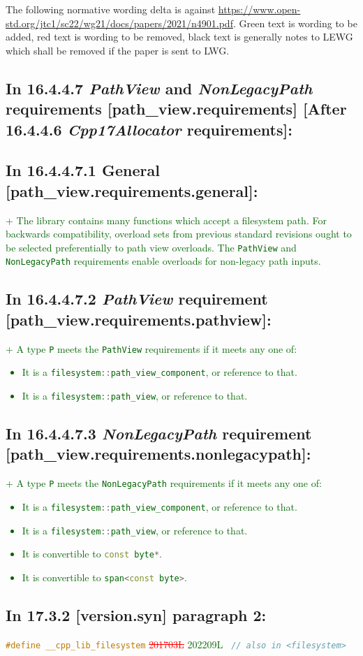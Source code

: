 \documentclass[11pt]{article}
\newcommand{\code}[2][cpp]{\lstinline[language=#1,basicstyle=\small\ttfamily]{#2}}
\newcommand{\tsrefp}[3]{\subsection*{In #2 \textbf{[#1]} paragraph #3:}}
\newcommand{\tsref}[2]{\subsection*{In #2 \textbf{[#1]}:}}
\newcommand{\tsrefz}[1]{\subsection*{In #1:}}
\newcommand{\tsreplace}[3]{\textcolor{red}{\sout{#1}}#2\textcolor{darkgreen}{#3}}
\begin{document}
The following normative wording delta is against \url{https://www.open-std.org/jtc1/sc22/wg21/docs/papers/2021/n4901.pdf}. Green text is wording to be added, red text is wording to be removed, black text is generally notes to LEWG which shall be removed if the paper is sent to LWG.

\tsref{After 16.4.4.6 \emph{Cpp17Allocator} requirements}{16.4.4.7 \emph{PathView} and \emph{NonLegacyPath} requirements [path\_view.requirements]}

\tsrefz{16.4.4.7.1 General [path\_view.requirements.general]}

\tsreplace{}{}{+ The library contains many functions which accept a filesystem path. For backwards compatibility, overload sets from previous standard revisions ought to be selected preferentially to path view overloads. The \code{PathView} and \code{NonLegacyPath} requirements enable overloads for non-legacy path inputs.}

\tsrefz{16.4.4.7.2 \emph{PathView} requirement [path\_view.requirements.pathview]}

\tsreplace{}{}{+ A type \code{P} meets the \code{PathView} requirements if it meets any one of:
\begin{itemize}
    \item It is a \code{filesystem::path_view_component}, or reference to that.
    \item It is a \code{filesystem::path_view}, or reference to that.
\end{itemize}}

\tsrefz{16.4.4.7.3 \emph{NonLegacyPath} requirement [path\_view.requirements.nonlegacypath]}

\tsreplace{}{}{+ A type \code{P} meets the \code{NonLegacyPath} requirements if it meets any one of:
\begin{itemize}
    \item It is a \code{filesystem::path_view_component}, or reference to that.
    \item It is a \code{filesystem::path_view}, or reference to that.
    \item It is convertible to \code{const byte*}.
    \item It is convertible to \code{span<const byte>}.
\end{itemize}}

\tsrefp{version.syn}{17.3.2}{2}

\code{#define __cpp_lib_filesystem}
\tsreplace{201703L}{ }{202209L}
\code{ // also in <filesystem>}
\end{document}
